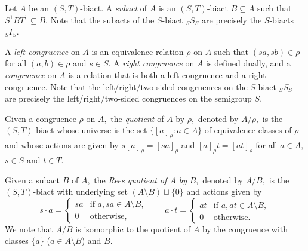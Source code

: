 \documentclass[twoside,a4paper,12pt,reqno]{amsart}
\theoremstyle{plain}
\newtheorem{lem}[thm]{Lemma}
\theoremstyle{definition}
\renewcommand{\l}{\mbox{${\mathcal{L}}$}}
\renewcommand{\r}{\mbox{${\mathcal{R}}$}}
\renewcommand{\j}{\mbox{${\mathcal{J}}$}}
\newcommand{\sm}{\setminus}
\begin{document}

%
Let $A$ be an $(S,T)$-biact.  A {\em subact} of $A$ is an $(S,T)$-biact $B\subseteq A$ such that $S^1BT^1\subseteq B.$  
Note that the subacts of the $S$-biact ${_S}S_S$ are precisely the $S$-biacts ${_S}I_S$.

A {\em left congruence} on $A$ is an equivalence relation $\rho$ on $A$ such that $(sa,sb)\in\rho$ for all $(a,b)\in\rho$ and $s\in S.$  A {\em right congruence} on $A$ is defined dually, and a {\em congruence} on $A$ is a relation that is both a left congruence and a right congruence.
Note that the left/right/two-sided congruences on the $S$-biact ${_S}S_S$ are precisely the left/right/two-sided congruences on the semigroup $S.$  

Given a congruence $\rho$ on $A,$ the {\em quotient} of $A$ by $\rho,$ denoted by $A/\rho,$ is the $(S,T)$-biact whose universe is the set $\{[a]_{\rho} : a\in A\}$ of equivalence classes of $\rho$ and whose actions are given by $s[a]_{\rho}=[sa]_{\rho}$ and $[a]_{\rho}t=[at]_{\rho}$ for all $a\in A,$ $s\in S$ and $t\in T.$  

Given a subact $B$ of $A,$ the {\em Rees quotient of $A$ by} $B,$ denoted by $A/B,$ is the $(S,T)$-biact with underlying set $(A{\sm}B)\sqcup\{0\}$ and actions given by
$$s\cdot a=\begin{cases}
sa&\text{if }a,sa\in A{\sm}B,\\
0&\text{otherwise,}
\end{cases}
\qquad
a\cdot t=\begin{cases}
at&\text{if }a,at\in A{\sm}B,\\
0&\text{otherwise.}
\end{cases}$$
We note that $A/B$ is isomorphic to the quotient of $A$ by the congruence with classes $\{a\}$ ($a\in A{\sm}B$) and $B.$
\end{document}

